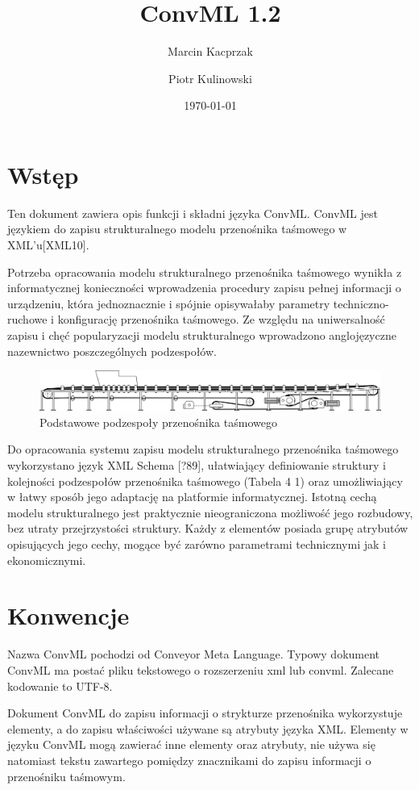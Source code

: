 \documentclass[12pt,a4paper]{article}
\title{ConvML 1.2}
\author{Marcin Kacprzak \and Piotr Kulinowski}
\date{\today}
\begin{document}
\maketitle
\tableofcontents

\section{Wstęp}
Ten dokument zawiera opis funkcji i składni języka ConvML.  ConvML jest językiem
do zapisu strukturalnego modelu przenośnika taśmowego w XML'u[XML10].

Potrzeba opracowania modelu strukturalnego przenośnika taśmowego wynikła z
informatycznej konieczności wprowadzenia procedury zapisu pełnej informacji o
urządzeniu, która jednoznacznie i spójnie opisywałaby parametry
techniczno-ruchowe i konfigurację przenośnika taśmowego.  Ze względu na
uniwersalność zapisu i chęć popularyzacji modelu strukturalnego wprowadzono
anglojęzyczne nazewnictwo poszczególnych podzespołów.

\begin{figure}
  \centering
  \includegraphics[width=\textwidth]{png/przenosnik}
  \caption{Podstawowe podzespoły przenośnika taśmowego}
  \label{fig:przenosnik}
\end{figure}

Do opracowania systemu zapisu modelu strukturalnego przenośnika taśmowego
wykorzystano język XML Schema [?89], ułatwiający definiowanie struktury i
kolejności podzespołów przenośnika taśmowego (Tabela 4 1) oraz umożliwiający w
łatwy sposób jego adaptację na platformie informatycznej.  Istotną cechą modelu
strukturalnego jest praktycznie nieograniczona możliwość jego rozbudowy, bez
utraty przejrzystości struktury.  Każdy z elementów posiada grupę atrybutów
opisujących jego cechy, mogące być zarówno parametrami technicznymi jak i
ekonomicznymi.

\section{Konwencje}
Nazwa ConvML pochodzi od Conveyor Meta Language.  Typowy dokument ConvML ma
postać pliku tekstowego o rozszerzeniu xml lub convml.  Zalecane kodowanie to
UTF-8.

Dokument ConvML do zapisu informacji o strykturze przenośnika wykorzystuje
elementy, a do zapisu właściwości używane są atrybuty języka XML.  Elementy w
języku ConvML mogą zawierać inne elementy oraz atrybuty, nie używa się natomiast
tekstu zawartego pomiędzy znacznikami do zapisu informacji o przenośniku
taśmowym.
\end{document}
